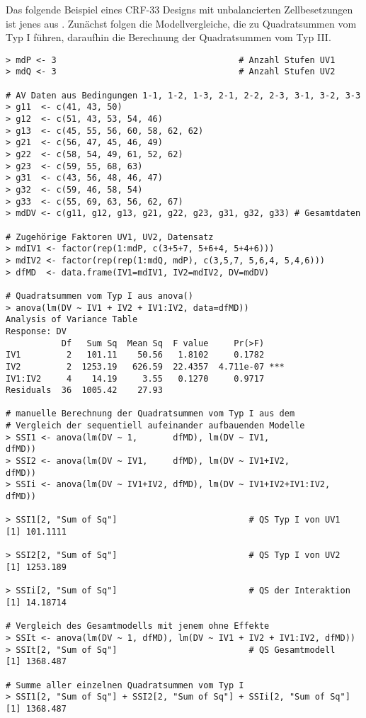Das folgende Beispiel eines CRF-$33$ Designs mit unbalancierten Zellbesetzungen ist jenes aus . Zunächst folgen die Modellvergleiche, die zu Quadratsummen vom Typ I führen, daraufhin die Berechnung der Quadratsummen vom Typ III\@.
\begin{lstlisting}
> mdP <- 3                                    # Anzahl Stufen UV1
> mdQ <- 3                                    # Anzahl Stufen UV2

# AV Daten aus Bedingungen 1-1, 1-2, 1-3, 2-1, 2-2, 2-3, 3-1, 3-2, 3-3
> g11  <- c(41, 43, 50)
> g12  <- c(51, 43, 53, 54, 46)
> g13  <- c(45, 55, 56, 60, 58, 62, 62)
> g21  <- c(56, 47, 45, 46, 49)
> g22  <- c(58, 54, 49, 61, 52, 62)
> g23  <- c(59, 55, 68, 63)
> g31  <- c(43, 56, 48, 46, 47)
> g32  <- c(59, 46, 58, 54)
> g33  <- c(55, 69, 63, 56, 62, 67)
> mdDV <- c(g11, g12, g13, g21, g22, g23, g31, g32, g33) # Gesamtdaten

# Zugehörige Faktoren UV1, UV2, Datensatz
> mdIV1 <- factor(rep(1:mdP, c(3+5+7, 5+6+4, 5+4+6)))
> mdIV2 <- factor(rep(rep(1:mdQ, mdP), c(3,5,7, 5,6,4, 5,4,6)))
> dfMD  <- data.frame(IV1=mdIV1, IV2=mdIV2, DV=mdDV)

# Quadratsummen vom Typ I aus anova()
> anova(lm(DV ~ IV1 + IV2 + IV1:IV2, data=dfMD))
Analysis of Variance Table
Response: DV
           Df   Sum Sq  Mean Sq  F value     Pr(>F)
IV1         2   101.11    50.56   1.8102     0.1782
IV2         2  1253.19   626.59  22.4357  4.711e-07 ***
IV1:IV2     4    14.19     3.55   0.1270     0.9717
Residuals  36  1005.42    27.93

# manuelle Berechnung der Quadratsummen vom Typ I aus dem
# Vergleich der sequentiell aufeinander aufbauenden Modelle
> SSI1 <- anova(lm(DV ~ 1,       dfMD), lm(DV ~ IV1,             dfMD))
> SSI2 <- anova(lm(DV ~ IV1,     dfMD), lm(DV ~ IV1+IV2,         dfMD))
> SSIi <- anova(lm(DV ~ IV1+IV2, dfMD), lm(DV ~ IV1+IV2+IV1:IV2, dfMD))

> SSI1[2, "Sum of Sq"]                          # QS Typ I von UV1
[1] 101.1111

> SSI2[2, "Sum of Sq"]                          # QS Typ I von UV2
[1] 1253.189

> SSIi[2, "Sum of Sq"]                          # QS der Interaktion
[1] 14.18714

# Vergleich des Gesamtmodells mit jenem ohne Effekte
> SSIt <- anova(lm(DV ~ 1, dfMD), lm(DV ~ IV1 + IV2 + IV1:IV2, dfMD))
> SSIt[2, "Sum of Sq"]                          # QS Gesamtmodell
[1] 1368.487

# Summe aller einzelnen Quadratsummen vom Typ I
> SSI1[2, "Sum of Sq"] + SSI2[2, "Sum of Sq"] + SSIi[2, "Sum of Sq"]
[1] 1368.487
\end{lstlisting}

